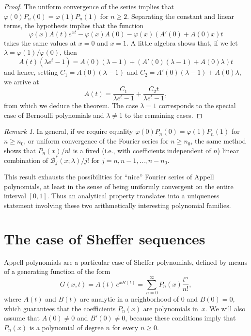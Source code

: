 \documentclass[11pt,a4paper]{amsart}
\newcommand{\AB}{\mathcal{B}}
\theoremstyle{plain}
\theoremstyle{plain}
\theoremstyle{plain}
\theoremstyle{remark}
\newtheorem*{remark}{Remark}
\begin{document}
\begin{proof}
The uniform convergence of the series implies that $\varphi(0)P_n(0) = \varphi(1)P_n(1)$ for $n \ge 2$.
Separating the constant and linear terms, the hypothesis implies that the function
\[
  \varphi(x)A(t)e^{xt} - \varphi(x)A(0) - \varphi(x)(A'(0)+A(0)x)t
\]
takes the same values at $x=0$ and $x=1$. A little algebra shows that, if we let $\lambda=\varphi(1)/\varphi(0)$, then
\[
  A(t)\left(\lambda e^t - 1\right) = A(0)(\lambda-1)+(A'(0)(\lambda-1)+A(0)\lambda)t
\]
and hence, setting $C_1=A(0)(\lambda-1)$ and $C_2=A'(0)(\lambda-1)+A(0)\lambda$, we arrive at
\[
  A(t) = \frac{C_1}{\lambda e^t - 1} + \frac{C_2 t}{\lambda e^t-1},
\]
from which we deduce the theorem. The case $\lambda = 1$ corresponds to the special case of Bernoulli polynomials and $\lambda \neq 1$ to the remaining cases.
\end{proof}

\begin{remark}
In general, if we require equality $\varphi(0)P_n(0)=\varphi(1)P_n(1)$ for $n \ge n_{0}$, or uniform convergence of the Fourier series for $n \ge n_{0}$, the same method shows that $P_{n}(x)/n!$ is a fixed (i.e., with coefficients independent of $n$) linear combination of $\AB^*_{j}(x;\lambda)/j!$ for $j=n,\allowbreak n-1,\dots,\allowbreak n-n_0$.
\end{remark}

This result exhausts the possibilities for ``nice'' Fourier series of Appell polynomials, at least in the sense of being uniformly convergent on the entire interval $[0,1]$. Thus an analytical property translates into a uniqueness statement involving these two arithmetically interesting polynomial families.


\section{The case of Sheffer sequences}
\label{sec:Sheffer}


Appell polynomials are a particular case of Sheffer polynomials, defined by means of a generating function of the form
\begin{equation}
\label{eq:FGenSheffer}
    G(x,t) = A(t)\,e^{xB(t)} = \sum_{n=0}^\infty P_n(x)\frac{t^n}{n!},
\end{equation}
where $A(t)$ and $B(t)$ are analytic in a neighborhood of $0$ and $B(0) = 0$, which guarantees that the coefficients $P_n(x)$ are polynomials in~$x$. We will also assume that $A(0) \ne 0$ and $B'(0) \ne 0$, because these conditions imply that $P_n(x)$ is a polynomial of degree $n$ for every $n \ge 0$.
\end{document}
